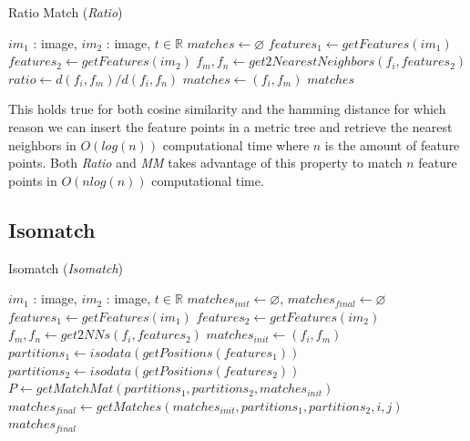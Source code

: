 \begin{algorithm}[t]
\caption{Ratio Match (\emph{Ratio})}
\label{alg-ratio}
{\fontsize{11}{11}\selectfont
\begin{algorithmic}
\Require $im_1$ : image, $im_2$ : image, $t \in \mathbb{R}$
\State $matches\gets \varnothing$
\State $features_1 \gets getFeatures(im_1)$
\State $features_2 \gets getFeatures(im_2)$
    \State $f_m,f_n \gets get2NearestNeighbors(f_i, features_2)$
    \State $ratio \gets d(f_i, f_m) / d(f_i, f_n)$
        \State $matches \gets \left(f_i, f_m\right)$
	\EndIf
\EndFor
\Return $matches$
\end{algorithmic}
}
\end{algorithm}

This holds true for both cosine similarity and the hamming distance for 
which reason we can insert the feature points in a metric tree and 
retrieve the nearest neighbors in $O(log(n))$ computational time where 
$n$ is the amount of feature points.  Both \emph{Ratio} and \emph{MM} 
takes advantage of this property to match $n$ feature points in 
$O(nlog(n))$ computational time.


\subsection{Isomatch}

\begin{algorithm}[h]
\caption{Isomatch (\emph{Isomatch})}
\label{alg-isomatch}
{\fontsize{11}{11}\selectfont
\begin{algorithmic}
\Require $im_1$ : image, $im_2$ : image, $t \in \mathbb{R}$
\State $matches_{init}\gets \varnothing$, $matches_{final}\gets 
\varnothing$
\State $features_1 \gets getFeatures(im_1)$
\State $features_2 \gets getFeatures(im_2)$
    \State $f_m,f_n \gets get2NNs(f_i, features_2)$
    \State $matches_{init} \gets \left(f_i, f_m\right)$
\EndFor
\State $partitions_1 \gets isodata(getPositions(features_1))$
\State $partitions_2 \gets isodata(getPositions(features_2))$
\State $P \gets getMatchMat(partitions_1, partitions_2, matches_{init})$
        \State $matches_{final} \gets getMatches(matches_{init}, 
        partitions_1, partitions_2, i, j)$
    \EndIf
\EndFor
\Return $matches_{final}$
\end{algorithmic}
}
\end{algorithm}

